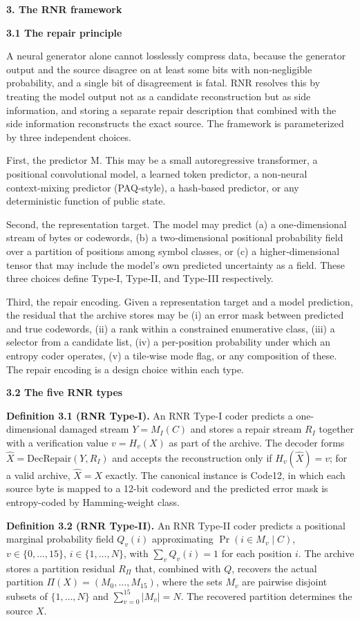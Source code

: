 \documentclass[
]{article}
\begin{document}
\textbf{3. The RNR framework}

\textbf{3.1 The repair principle}

A neural generator alone cannot losslessly compress data, because the
generator output and the source disagree on at least some bits with
non‑negligible probability, and a single bit of disagreement is fatal.
RNR resolves this by treating the model output not as a candidate
reconstruction but as side information, and storing a separate repair
description that combined with the side information reconstructs the
exact source. The framework is parameterized by three independent
choices.

First, the predictor M. This may be a small autoregressive transformer,
a positional convolutional model, a learned token predictor, a
non‑neural context‑mixing predictor (PAQ‑style), a hash‑based predictor,
or any deterministic function of public state.

Second, the representation target. The model may predict (a) a
one‑dimensional stream of bytes or codewords, (b) a two‑dimensional
positional probability field over a partition of positions among symbol
classes, or (c) a higher‑dimensional tensor that may include the model's
own predicted uncertainty as a field. These three choices define Type‑I,
Type‑II, and Type‑III respectively.

Third, the repair encoding. Given a representation target and a model
prediction, the residual that the archive stores may be (i) an error
mask between predicted and true codewords, (ii) a rank within a
constrained enumerative class, (iii) a selector from a candidate list,
(iv) a per‑position probability under which an entropy coder operates,
(v) a tile‑wise mode flag, or any composition of these. The repair
encoding is a design choice within each type.

\textbf{3.2 The five RNR types}

\textbf{Definition 3.1 (RNR Type-I).} An RNR Type-I coder predicts a
one-dimensional damaged stream $Y = M_I(C)$ and stores a repair
stream $R_I$ together with a verification value $v = H_v(X)$ as part
of the archive. The decoder forms
$\hat{X} = \mathrm{DecRepair}(Y, R_I)$ and accepts the reconstruction
only if $H_v(\hat{X}) = v$; for a valid archive, $\hat{X} = X$
exactly. The canonical instance is Code12, in which each source byte
is mapped to a 12-bit codeword and the predicted error mask is
entropy-coded by Hamming-weight class.

\textbf{Definition 3.2 (RNR Type-II).} An RNR Type-II coder predicts
a positional marginal probability field $Q_v(i)$ approximating
$\Pr(i \in M_v \mid C)$, $v \in \{0, \ldots, 15\}$,
$i \in \{1, \ldots, N\}$, with $\sum_v Q_v(i) = 1$ for each position
$i$. The archive stores a partition residual $R_\Pi$ that, combined
with $Q$, recovers the actual partition
$\Pi(X) = (M_0, \ldots, M_{15})$, where the sets $M_v$ are pairwise
disjoint subsets of $\{1, \ldots, N\}$ and
$\sum_{v=0}^{15} |M_v| = N$. The recovered partition determines the
source $X$.
\end{document}
